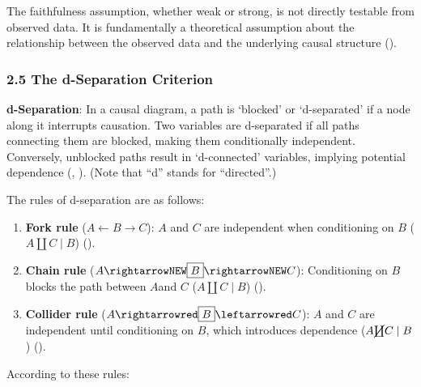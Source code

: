 \documentclass[
  single column]{article}
\begin{document}
The faithfulness assumption, whether weak or strong, is not directly
testable from observed data. It is fundamentally a theoretical
assumption about the relationship between the observed data and the
underlying causal structure ().

\subsubsection{2.5 The d-Separation
Criterion}\label{the-d-separation-criterion}

\textbf{d-Separation}: In a causal diagram, a path is `blocked' or
`d-separated' if a node along it interrupts causation. Two variables are
d-separated if all paths connecting them are blocked, making them
conditionally independent. Conversely, unblocked paths result in
`d-connected' variables, implying potential dependence
(, ).
(Note that ``d'' stands for ``directed''.)

The rules of d-separation are as follows:

\begin{enumerate}
\def\labelenumi{\alph{enumi}.}
\item
  \textbf{Fork rule} (\(A \leftarrow \boxed{B} \rightarrow C\)): \(A\)
  and \(C\) are independent when conditioning on \(B\)
  (\(A \coprod C \mid B\)) ().
\item
  \textbf{Chain rule} (\(A \rightarrowNEW \boxed{B} \rightarrowNEW C\)):
  Conditioning on \(B\)blocks the path between \(A\)and \(C\)
  (\(A \coprod C \mid B\)) ().
\item
  \textbf{Collider rule}
  (\(A \rightarrowred \boxed{B} \leftarrowred C\)): \(A\) and \(C\) are
  independent until conditioning on \(B\), which introduces dependence
  (\(A \cancel{\coprod} C \mid B\)) ().
\end{enumerate}

According to these rules:
\end{document}
